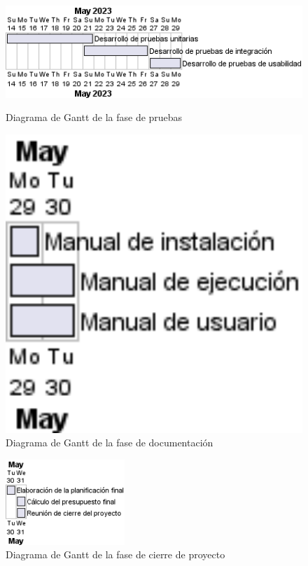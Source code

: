 \begin{figure}[H]
	\centering
	\begin{minipage}{0.65\textwidth}
		\includegraphics[width=1\textwidth]{4-PlanificacionYGestionDelTFG/PlanificacionInicial/gant-pruebas.png}
		\caption{Diagrama de Gantt de la fase de pruebas}
	\end{minipage}
	\hfill
	\begin{minipage}{0.25\textwidth}
		\includegraphics[width=1\textwidth]{4-PlanificacionYGestionDelTFG/PlanificacionInicial/gant-documentacion.png}
		\caption{Diagrama de Gantt de la fase de documentación}
	\end{minipage}
\end{figure}

\begin{figure}[H]
	\centering
	\includegraphics[width=0.4\textwidth]{4-PlanificacionYGestionDelTFG/PlanificacionInicial/gant-cierre.png}
	\caption{Diagrama de Gantt de la fase de cierre de proyecto}
\end{figure}